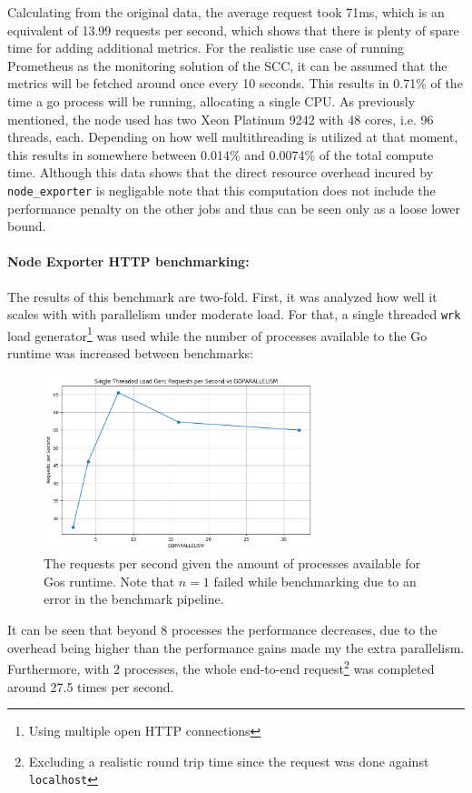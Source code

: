 Calculating from the original data, the average request took 71ms, which is an equivalent of 13.99 requests per second, which shows that there is plenty of spare time for adding additional metrics. For the realistic use case of running Prometheus as the monitoring solution of the \ac{SCC}, it can be assumed that the metrics will be fetched around once every 10 seconds. This results in 0.71\% of the time a go process will be running, allocating a single CPU. As previously mentioned, the node used has two Xeon Platinum 9242 with 48 cores, i.e. 96 threads, each. Depending on how well multithreading is utilized at that moment, this results in somewhere between 0.014\% and 0.0074\% of the total compute time. Although this data shows that the direct resource overhead incured by \texttt{node\_exporter} is negligable note that this computation does not include the performance penalty on the other jobs and thus can be seen only as a loose lower bound.\\

\paragraph{Node Exporter HTTP benchmarking:} The results of this benchmark are two-fold. First, it was analyzed how well it scales with with parallelism under moderate load. For that, a single threaded \texttt{wrk} load generator\footnote{Using multiple open HTTP connections} was used while the number of processes available to the Go runtime was increased between benchmarks:

\begin{figure}[H]
  \centering
  \includegraphics[width=0.7\textwidth]{./plots/node_exporter_performance_per_parallelism.png}
  \caption{The requests per second given the amount of processes available for Gos runtime. Note that $n=1$ failed while benchmarking due to an error in the benchmark pipeline.}
\end{figure}
It can be seen that beyond 8 processes the performance decreases, due to the overhead being higher than the performance gains made my the extra parallelism. Furthermore, with 2 processes, the whole end-to-end request\footnote{Excluding a realistic round trip time since the request was done against \texttt{localhost}} was completed around 27.5 times per second.\\

